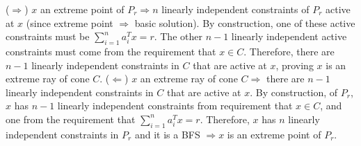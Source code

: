 \documentclass[12pt]{exam}
\begin{document}
\begin{questions}
\begin{parts}
      \begin{subparts}
        \subpart ($\Longrightarrow$) 
        $x$ an extreme point of $P_r \Longrightarrow n$ linearly independent constraints of $P_r$ active at $x$ (since extreme point $\Rightarrow$ basic solution). By construction, one of these active constraints must be $\sum_{i=1}^n a_i^Tx = r$. The other $n-1$ linearly independent active constraints must come from the requirement that $x\in C$. Therefore, there are $n-1$ linearly independent constraints in $C$ that are active at $x$, proving $x$ is an extreme ray of cone $C$. 
        \subpart ($\Longleftarrow$) $x$ an extreme ray of cone $C \Longrightarrow$ there are $n-1$ linearly independent constraints in $C$ that are active at $x$. By construction, of $P_r$, $x$ has $n-1$ linearly independent constraints from requirement that $x \in C$, and one from the requirement that $\sum_{i=1}^n a_i^Tx = r$. Therefore, $x$ has $n$ linearly independent constraints in $P_r$ and it is a BFS $\Rightarrow x$ is an extreme point of $P_r$.
      \end{subparts}
    \end{parts}


\end{questions}
\end{document}
